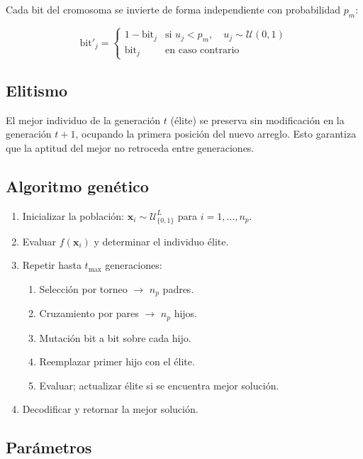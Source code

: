 \documentclass[11pt]{article}
\begin{document}
Cada bit del cromosoma se invierte de forma independiente con probabilidad $p_m$:

\[
\text{bit}'_j =
\begin{cases}
1 - \text{bit}_j & \text{si } u_j < p_m,\quad u_j \sim \mathcal{U}(0,1) \\
\text{bit}_j     & \text{en caso contrario}
\end{cases}
\]

\subsection{Elitismo}

El mejor individuo de la generaci\'on $t$ (\'elite) se preserva sin modificaci\'on en la generaci\'on $t+1$, ocupando la primera posici\'on del nuevo arreglo. Esto garantiza que la aptitud del mejor no retroceda entre generaciones.

\subsection{Algoritmo gen\'etico}

\begin{enumerate}
    \item Inicializar la poblaci\'on: $\mathbf{x}_i \sim \mathcal{U}_{\{0,1\}}^{L}$ para $i = 1,\ldots,n_p$.
    \item Evaluar $f(\mathbf{x}_i)$ y determinar el individuo \'elite.
    \item Repetir hasta $t_{\max}$ generaciones:
    \begin{enumerate}
        \item Selecci\'on por torneo $\rightarrow$ $n_p$ padres.
        \item Cruzamiento por pares $\rightarrow$ $n_p$ hijos.
        \item Mutaci\'on bit a bit sobre cada hijo.
        \item Reemplazar primer hijo con el \'elite.
        \item Evaluar; actualizar \'elite si se encuentra mejor soluci\'on.
    \end{enumerate}
    \item Decodificar y retornar la mejor soluci\'on.
\end{enumerate}

\subsection{Par\'ametros}
\end{document}

